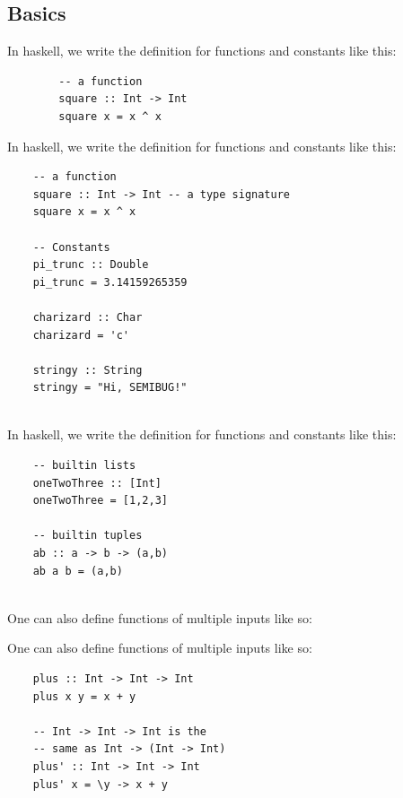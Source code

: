 \documentclass[tikz]{beamer}
\theoremstyle{definition}
\begin{document}
\subsection{Basics}


\begin{frame}[fragile]
	In haskell, we write the definition for functions and constants like this:
	
	\begin{verbatim}
		-- a function
		square :: Int -> Int 
		square x = x ^ x	
	\end{verbatim}
\end{frame}

\begin{frame}[fragile]
	In haskell, we write the definition for functions and constants like this:
	
	\begin{verbatim}
	-- a function
	square :: Int -> Int -- a type signature
	square x = x ^ x	
	
	-- Constants
	pi_trunc :: Double
	pi_trunc = 3.14159265359
		
	charizard :: Char
	charizard = 'c'
		
	stringy :: String
	stringy = "Hi, SEMIBUG!"
		
	\end{verbatim}
\end{frame}

\begin{frame}[fragile]
	In haskell, we write the definition for functions and constants like this:
	
	\begin{verbatim}
	-- builtin lists
	oneTwoThree :: [Int]
	oneTwoThree = [1,2,3]
	
	-- builtin tuples
	ab :: a -> b -> (a,b)
	ab a b = (a,b) 
		
	\end{verbatim}
\end{frame}

\begin{frame}[fragile]
	One can also define functions of multiple inputs like so: 
\end{frame}

\begin{frame}[fragile]
	One can also define functions of multiple inputs like so: 
	
	\begin{verbatim}
	plus :: Int -> Int -> Int 
	plus x y = x + y
		
	-- Int -> Int -> Int is the 
	-- same as Int -> (Int -> Int)
	plus' :: Int -> Int -> Int 
	plus' x = \y -> x + y	
	\end{verbatim}
	
\end{frame}
\end{document}
